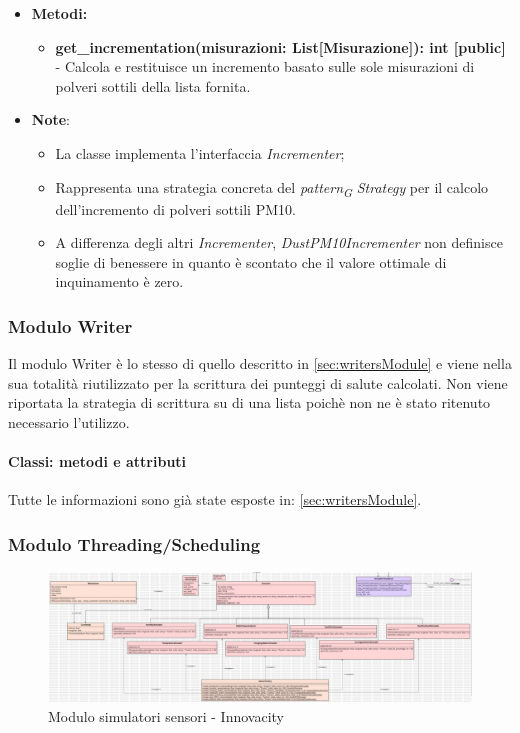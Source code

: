 \begin{itemize}
    \begin{itemize}
    \item \textbf{Metodi: } 
    \begin{itemize}
        \item \textbf{get\_incrementation(misurazioni: List[Misurazione]): int [public]} - Calcola e restituisce un incremento basato sulle sole misurazioni di polveri sottili della lista fornita.
    \end{itemize}
    \item\textbf{Note}:
        \begin{itemize}
            \item La classe implementa l'interfaccia \textit{Incrementer};
            \item Rappresenta una strategia concreta del \textit{pattern}\textsubscript{\textit{G}} \textit{Strategy} per il calcolo dell'incremento di polveri sottili PM10.
            \item A differenza degli altri \textit{Incrementer}, \textit{DustPM10Incrementer} non definisce soglie di benessere in quanto è scontato che il valore ottimale di inquinamento è zero.
        \end{itemize}
    \end{itemize}

\end{itemize}

\subsubsection{Modulo Writer}
Il modulo Writer è lo stesso di quello descritto in \ref*{sec:writersModule} e viene nella sua totalità riutilizzato per la scrittura dei punteggi di salute calcolati.
Non viene riportata la strategia di scrittura su di una lista poichè non ne è stato ritenuto necessario l'utilizzo.

\paragraph*{Classi: metodi e attributi}
Tutte le informazioni sono già state esposte in: \ref*{sec:writersModule}.

\subsubsection{Modulo Threading/Scheduling}
\begin{figure}[H]
    \centering
    \includegraphics[width=1\textwidth]{../Images/SpecificaTecnica/simulatoriSensori.PNG}
    \caption{Modulo simulatori sensori - Innovacity}
    \label{fig: fddf}
\end{figure}

